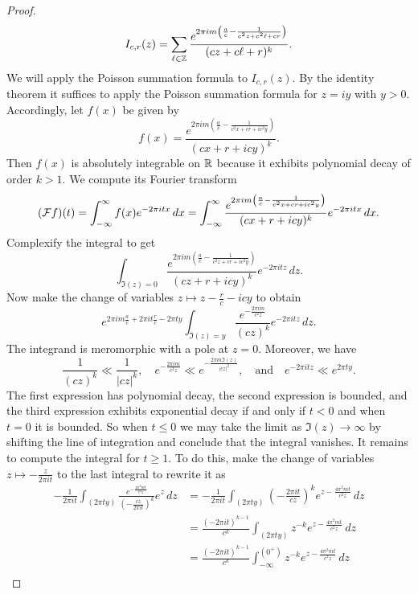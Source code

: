 \begin{proof}
      \[
        I_{c,r}(z) = \sum_{\ell \in \mathbb{Z}}\frac{e^{2\pi im\left(\frac{a}{c}-\frac{1}{c^{2}z+c^{2}\ell+cr}\right)}}{(cz+c\ell+r)^{k}}.
      \]
      We will apply the Poisson summation formula to $I_{c,r}(z)$. By the identity theorem it suffices to apply the Poisson summation formula for $z = iy$ with $y > 0$. Accordingly, let $f(x)$ be given by
      \[
        f(x) = \frac{e^{2\pi im\left(\frac{a}{c}-\frac{1}{c^{2}x+cr+ic^{2}y}\right)}}{(cx+r+icy)^{k}}.
      \]
      Then $f(x)$ is absolutely integrable on $\mathbb{R}$ because it exhibits polynomial decay of order $k > 1$. We compute its Fourier transform
      \[
        (\mathcal{F}f)(t) = \int_{-\infty}^{\infty}f(x)e^{-2\pi itx}\,dx = \int_{-\infty}^{\infty}\frac{e^{2\pi im\left(\frac{a}{c}-\frac{1}{c^{2}x+cr+ic^{2}y}\right)}}{(cx+r+icy)^{k}}e^{-2\pi itx}\,dx.
      \]
      Complexify the integral to get
      \[
        \int_{\Im(z) = 0}\frac{e^{2\pi im\left(\frac{a}{c}-\frac{1}{c^{2}z+cr+ic^{2}y}\right)}}{(cz+r+icy)^{k}}e^{-2\pi itz}\,dz.
      \]
      Now make the change of variables $z \mapsto z-\frac{r}{c}-icy$ to obtain
      \[
        e^{2\pi im\frac{a}{c}+2\pi it\frac{r}{c}-2\pi ty}\int_{\Im(z) = y}\frac{e^{-\frac{2\pi im}{c^{2}z}}}{(cz)^{k}}e^{-2\pi itz}\,dz.
      \]
      The integrand is meromorphic with a pole at $z = 0$. Moreover, we have
      \[
        \frac{1}{(cz)^{k}} \ll \frac{1}{|cz|^{k}}, \quad e^{-\frac{2\pi im}{c^{2}z}} \ll e^{-\frac{2\pi m\Im(z)}{|cz|^{2}}}, \quad \text{and} \quad e^{-2\pi itz} \ll e^{2\pi ty}.
      \]
      The first expression has polynomial decay, the second expression is bounded, and the third expression exhibits exponential decay if and only if $t < 0$ and when $t = 0$ it is bounded. So when $t \le 0$ we may take the limit as $\Im(z) \to \infty$ by shifting the line of integration and conclude that the integral vanishes. It remains to compute the integral for $t \ge 1$. To do this, make the change of variables $z \mapsto -\frac{z}{2\pi it}$ to the last integral to rewrite it as
      \begin{align*}
        -\frac{1}{2\pi it}\int_{(2\pi ty)}\frac{e^{-\frac{4\pi^{2}mt}{c^{2}z}}}{\left(-\frac{cz}{2\pi it}\right)^{k}}e^{z}\,dz &= -\frac{1}{2\pi it}\int_{(2\pi ty)}\left(-\frac{2\pi it}{cz}\right)^{k}e^{z-\frac{4\pi^{2}mt}{c^{2}z}}\,dz \\
        &= \frac{(-2\pi it)^{k-1}}{c^{k}}\int_{(2\pi ty)}z^{-k}e^{z-\frac{4\pi^{2}mt}{c^{2}z}}\,dz \\
        &= \frac{(-2\pi it)^{k-1}}{c^{k}}\int_{-\infty}^{(0^{+})}z^{-k}e^{z-\frac{4\pi^{2}mt}{c^{2}z}}\,dz \\

\end{align*}
\end{proof}
